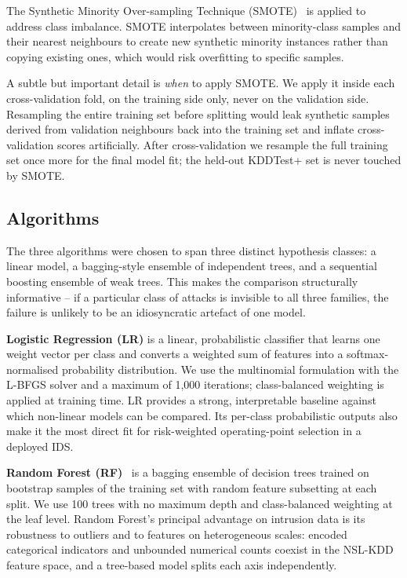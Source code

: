 \documentclass[conference, twocolumn]{IEEEtran}
\begin{document}
The Synthetic Minority Over-sampling Technique (SMOTE)~\cite{chawla2002} is applied to address class imbalance. SMOTE interpolates between minority-class samples and their nearest neighbours to create new synthetic minority instances rather than copying existing ones, which would risk overfitting to specific samples.

A subtle but important detail is \emph{when} to apply SMOTE. We apply it inside each cross-validation fold, on the training side only, never on the validation side. Resampling the entire training set before splitting would leak synthetic samples derived from validation neighbours back into the training set and inflate cross-validation scores artificially. After cross-validation we resample the full training set once more for the final model fit; the held-out KDDTest+ set is never touched by SMOTE.

\subsection{Algorithms}

The three algorithms were chosen to span three distinct hypothesis classes: a linear model, a bagging-style ensemble of independent trees, and a sequential boosting ensemble of weak trees. This makes the comparison structurally informative -- if a particular class of attacks is invisible to all three families, the failure is unlikely to be an idiosyncratic artefact of one model.

\textbf{Logistic Regression (LR)} is a linear, probabilistic classifier that learns one weight vector per class and converts a weighted sum of features into a softmax-normalised probability distribution. We use the multinomial formulation with the L-BFGS solver and a maximum of 1{,}000 iterations; class-balanced weighting is applied at training time. LR provides a strong, interpretable baseline against which non-linear models can be compared. Its per-class probabilistic outputs also make it the most direct fit for risk-weighted operating-point selection in a deployed IDS.

\textbf{Random Forest (RF)}~\cite{breiman2001} is a bagging ensemble of decision trees trained on bootstrap samples of the training set with random feature subsetting at each split. We use 100 trees with no maximum depth and class-balanced weighting at the leaf level. Random Forest's principal advantage on intrusion data is its robustness to outliers and to features on heterogeneous scales: encoded categorical indicators and unbounded numerical counts coexist in the NSL-KDD feature space, and a tree-based model splits each axis independently.
\end{document}
